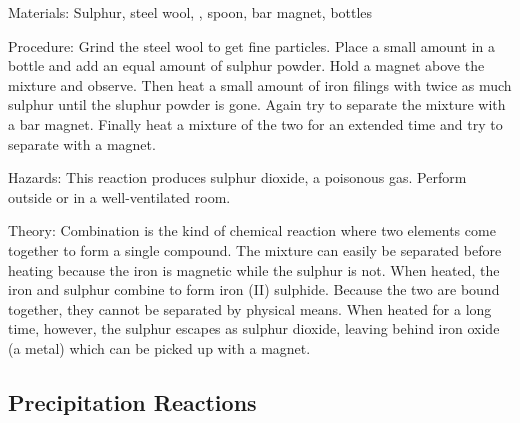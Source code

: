 \begin{multicols}{2}
\begin{description*}
\item[Materials:]{Sulphur, steel wool, , spoon, bar magnet, bottles}
\item[Procedure:]{Grind the steel wool to get fine particles. Place a small amount in a bottle and add an equal amount of sulphur powder. Hold a magnet above the mixture and observe. Then heat a small amount of iron filings with twice as much sulphur until the sluphur powder is gone. Again try to separate the mixture with a bar magnet. Finally heat a mixture of the two for an extended time and try to separate with a magnet.}
\item[Hazards:]{This reaction produces sulphur dioxide, a poisonous gas. Perform outside or in a well-ventilated room.}
\item[Theory:]{Combination is the kind of chemical reaction where two elements come
together to form a single compound. The mixture can easily be separated before heating because the iron is magnetic while the sulphur is not. When heated, the iron and sulphur combine to form iron (II) sulphide. Because the two are bound together, they cannot be separated by physical means. When heated for a long time, however, the sulphur escapes as sulphur dioxide, leaving behind iron oxide (a metal) which can be picked up with a magnet.}
\end{description*}

\subsection{Precipitation Reactions}



\end{multicols}
